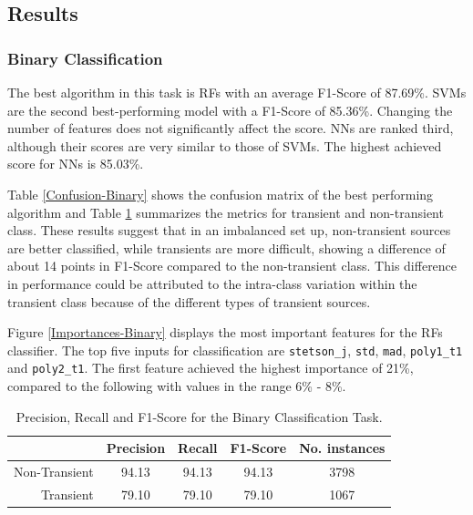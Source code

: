 \documentclass[usenatbib]{mnras}
\begin{document}
\subsection{Results}

\subsubsection{Binary Classification} 
\label{Results-Binary} 

The best algorithm in this task is RFs with an average F1-Score of
87.69\%.   
SVMs are the second best-performing model with a F1-Score of 85.36\%. 
Changing the number of features does not significantly affect the score.
NNs are ranked third, although their scores are very similar to those of SVMs. 
The highest achieved score for NNs is 85.03\%.

Table \ref{Confusion-Binary} shows the confusion matrix of the best
performing algorithm and Table \ref{Overall-Scores-Binary} summarizes 
the metrics for transient and non-transient class. These results suggest 
that in an imbalanced set up, non-transient sources are better classified, 
while transients are more difficult, showing a difference of about 
14 points in F1-Score compared to the non-transient class. 
This difference in performance could be attributed to the intra-class
variation within the transient class because of the different 
types of transient sources.  

Figure \ref{Importances-Binary} displays the most important features
for the RFs classifier.
The top five inputs for classification are \texttt{stetson\_j},
\texttt{std}, \texttt{mad}, \texttt{poly1\_t1} and \texttt{poly2\_t1}.  
The first feature achieved the highest importance of 21\%, compared to
the following with values in the range 6\% - 8\%.  


\begin{table}
\centering
\begin{tabular}{|r|c|c|c|c|}
\hline
\multicolumn{1}{|l|}{} & Precision & Recall & F1-Score & No. instances \\ \hline \hline
Non-Transient          & 94.13     & 94.13      & 94.13      & 3798   \\ \hline
Transient              & 79.10     & 79.10      & 79.10      & 1067    \\ \hline
\end{tabular}
\caption{Precision, Recall and F1-Score for the Binary Classification Task.}
\label{Overall-Scores-Binary}
\end{table}
\end{document}
